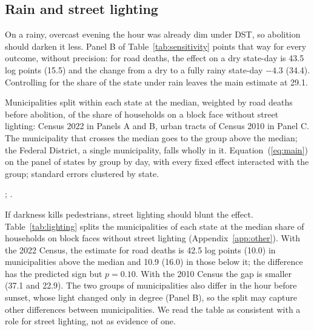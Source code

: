 \subsection{Rain and street lighting}

On a rainy, overcast evening the hour was already dim under DST, so abolition should darken it less. Panel B of Table~\ref{tab:sensitivity} points that way for every outcome, without precision: for road deaths, the effect on a dry state-day is 43.5 log points (15.5) and the change from a dry to a fully rainy state-day $-4.3$ (34.4). Controlling for the share of the state under rain leaves the main estimate at 29.1.

\begin{table}[tbp]
  \caption{Street Lighting}
  \label{tab:lighting}
  \centering\footnotesize
  
  \begin{tablenotes}[Notes]
  Municipalities split within each state at the median, weighted by road deaths before abolition, of the share of households on a block face without street lighting: Census 2022 in Panels A and B, urban tracts of Census 2010 in Panel C. The municipality that crosses the median goes to the group above the median; the Federal District, a single municipality, falls wholly in it. Equation~(\ref{eq:main}) on the panel of states by group by day, with every fixed effect interacted with the group; standard errors clustered by state.
  \end{tablenotes}
  \begin{tablenotes}[Sources]
  \citet{ibge2023censo}; \citet{ibge2011censo}.
  \end{tablenotes}
\end{table}

If darkness kills pedestrians, street lighting should blunt the effect. Table~\ref{tab:lighting} splits the municipalities of each state at the median share of households on block faces without street lighting (Appendix~\ref{app:other}). With the 2022 Census, the estimate for road deaths is 42.5 log points (10.0) in municipalities above the median and 10.9 (16.0) in those below it; the difference has the predicted sign but $p=0.10$. With the 2010 Census the gap is smaller (37.1 and 22.9). The two groups of municipalities also differ in the hour before sunset, whose light changed only in degree (Panel B), so the split may capture other differences between municipalities. We read the table as consistent with a role for street lighting, not as evidence of one.

